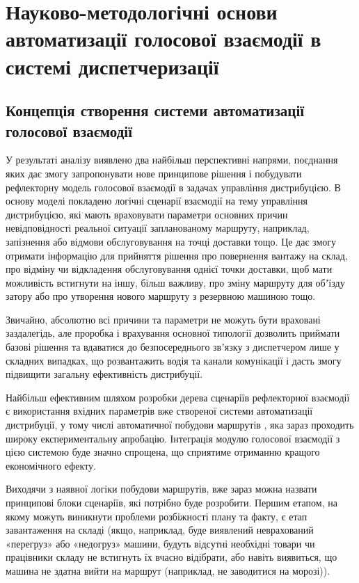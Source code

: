 \chapter{Науково-методологічні основи автоматизації голосової взаємодії в системі диспетчеризації} \label{chapt2}

\section{Концепція створення системи автоматизації голосової взаємодії} \label{sect2_1}

У результаті аналізу виявлено два найбільш перспективні напрями, поєднання яких дає змогу запропонувати нове принципове рішення і побудувати рефлекторну модель голосової взаємодії в задачах управління дистрибуцією. В основу моделі покладено логічні сценарії взаємодії на тему управління дистрибуцією, які мають враховувати параметри основних причин невідповідності реальної ситуації запланованому маршруту, наприклад, запізнення або відмови обслуговування на точці доставки тощо. Це дає змогу отримати інформацію для прийняття рішення про повернення вантажу на склад, про відміну чи відкладення обслуговування однієї точки доставки, щоб мати можливість встигнути на іншу, більш важливу, про зміну маршруту для обʼїзду затору або про утворення нового маршруту з резервною машиною тощо.

Звичайно, абсолютно всі причини та параметри не можуть бути враховані заздалегідь, але проробка і врахування основної типології дозволить приймати базові рішення та вдаватися до безпосереднього звʼязку з диспетчером лише у складних випадках, що розвантажить водія та канали комунікації і дасть змогу підвищити загальну ефективність дистрибуції.

Найбільш ефективним шляхом розробки дерева сценаріїв рефлекторної взаємодії є використання вхідних параметрів вже створеної системи автоматизації дистрибуції, у тому числі автоматичної побудови маршрутів \cite{as6}, яка зараз проходить широку експериментальну апробацію. Інтеграція модулю голосової взаємодії з цією системою буде значно спрощена, що сприятиме отриманню кращого економічного ефекту.

Виходячи з наявної логіки побудови маршрутів, вже зараз можна назвати принципові блоки сценаріїв, які потрібно буде розробити. Першим етапом, на якому можуть виникнути проблеми розбіжності плану та факту, є етап завантаження на складі (якщо, наприклад, буде виявлений неврахований «перегруз» або «недогруз» машини, будуть відсутні необхідні товари чи працівники складу не встигнуть їх вчасно відібрати, або навіть виявиться, що машина не здатна вийти на маршрут (наприклад, не заводитися на морозі)).


